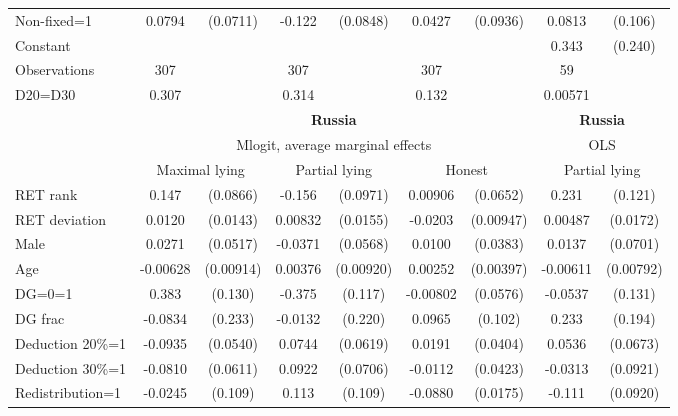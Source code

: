 \begin{tabular}{l|cccccc|cc}
Non-fixed=1     &   0.0794         & (0.0711)&   -0.122         & (0.0848)&   0.0427         & (0.0936)&   0.0813         &  (0.106)\\
Constant        &                  &         &                  &         &                  &         &    0.343         &  (0.240)\\
\hline
Observations    &      307         &         &      307         &         &      307         &         &       59         &         \\
D20=D30         &    0.307         &         &    0.314         &         &    0.132         &         &  0.00571         &         \\
\hline\hline
&\multicolumn{6}{c|}{\bf Russia}&\multicolumn{2}{c}{\bf Russia}\\ &\multicolumn{6}{c|}{Mlogit, average marginal effects }&\multicolumn{2}{c}{OLS}\\
                &\multicolumn{2}{c}{Maximal lying}&\multicolumn{2}{c}{Partial lying}&\multicolumn{2}{c}{Honest}  &\multicolumn{2}{c}{Partial lying}\\
\hline
RET rank        &    0.147\sym{*}  & (0.0866)&   -0.156         & (0.0971)&  0.00906         & (0.0652)&    0.231\sym{*}  &  (0.121)\\
RET deviation   &   0.0120         & (0.0143)&  0.00832         & (0.0155)&  -0.0203\sym{**} &(0.00947)&  0.00487         & (0.0172)\\
Male            &   0.0271         & (0.0517)&  -0.0371         & (0.0568)&   0.0100         & (0.0383)&   0.0137         & (0.0701)\\
Age             & -0.00628         &(0.00914)&  0.00376         &(0.00920)&  0.00252         &(0.00397)& -0.00611         &(0.00792)\\
DG=0=1          &    0.383\sym{***}&  (0.130)&   -0.375\sym{***}&  (0.117)& -0.00802         & (0.0576)&  -0.0537         &  (0.131)\\
DG frac         &  -0.0834         &  (0.233)&  -0.0132         &  (0.220)&   0.0965         &  (0.102)&    0.233         &  (0.194)\\
Deduction 20\%=1&  -0.0935\sym{*}  & (0.0540)&   0.0744         & (0.0619)&   0.0191         & (0.0404)&   0.0536         & (0.0673)\\
Deduction 30\%=1&  -0.0810         & (0.0611)&   0.0922         & (0.0706)&  -0.0112         & (0.0423)&  -0.0313         & (0.0921)\\
Redistribution=1&  -0.0245         &  (0.109)&    0.113         &  (0.109)&  -0.0880\sym{***}& (0.0175)&   -0.111         & (0.0920)\\

\end{tabular}
